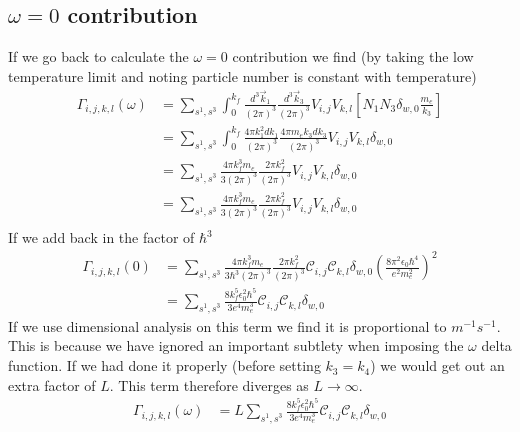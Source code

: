 \subsection{\(\omega = 0\) contribution}\label{sec:omega 0 contribution}
If we go back to calculate the
\(\omega = 0\) contribution
we find (by taking the low
temperature limit and noting
particle number is constant
with temperature)
\begin{align}
    \Gamma_{i,j, k,l}(\omega) & =
    \sum_{s^1,s^3} \int_0^{k_f}
    \frac{d^3\vec{k}_1}{{(2\pi)}^3}
    \frac{d^3\vec{k}_3}{{(2\pi)}^3}
    V_{i,j} V_{k,l} [
    N_1 N_3 \delta_{w, 0} \frac{m_e}{k_3}] \\
                              & =
    \sum_{s^1,s^3} \int_0^{k_f}
    \frac{4\pi k_1^2 dk_1}{{(2\pi)}^3}
    \frac{4 \pi m_e k_3 dk_3}{{(2\pi)}^3}
    V_{i,j} V_{k,l} \delta_{w, 0}          \\
                              & =
    \sum_{s^1,s^3} \frac{4\pi k_f^3 m_e}{3{(2\pi)}^3}
    \frac{2 \pi k_f^2}{{(2\pi)}^3}
    V_{i,j} V_{k,l} \delta_{w, 0}          \\
                              & =
    \sum_{s^1,s^3} \frac{4\pi k_f^3 m_e}{3{(2\pi)}^3}
    \frac{2 \pi k_f^2}{{(2\pi)}^3}
    V_{i,j} V_{k,l} \delta_{w, 0}          \\
\end{align}
If we add back in the factor of  \(\hbar^3\)
\begin{align}
    \Gamma_{i,j, k,l}(0) & =
    \sum_{s^1,s^3} \frac{4\pi k_f^3 m_e}{3\hbar^3{(2\pi)}^3}
    \frac{2 \pi k_f^2}{{(2\pi)}^3}
    \mathcal{C}_{i,j} \mathcal{C}_{k,l}
    \delta_{w, 0} {(\frac{8 \pi^2 \epsilon_0 \hbar^4}{e^2 m_e^2})}^2 \\
                         & =
    \sum_{s^1,s^3}
    \frac{8k_f^5 \epsilon_0^2 \hbar^5}{3e^4 m_e^3}
    \mathcal{C}_{i,j} \mathcal{C}_{k,l} \delta_{w, 0}
\end{align}
If we use dimensional analysis on this term
we find it is proportional to \(m^{-1}s^{-1}\).
This is because we have ignored an important
subtlety when imposing the \(\omega \) delta
function. If we had done it properly (before
setting \(k_3 = k_4\)) we would get
out an extra factor of \(L\). This term
therefore diverges as \(L \rightarrow \infty \).
\begin{align}
    \Gamma_{i,j, k,l}(\omega) & =
    L \sum_{s^1,s^3}
    \frac{8k_f^5 \epsilon_0^2 \hbar^5}{3e^4 m_e^3}
    \mathcal{C}_{i,j} \mathcal{C}_{k,l} \delta_{w, 0}
    \label{eqn:divergent expression for first integral}
\end{align}